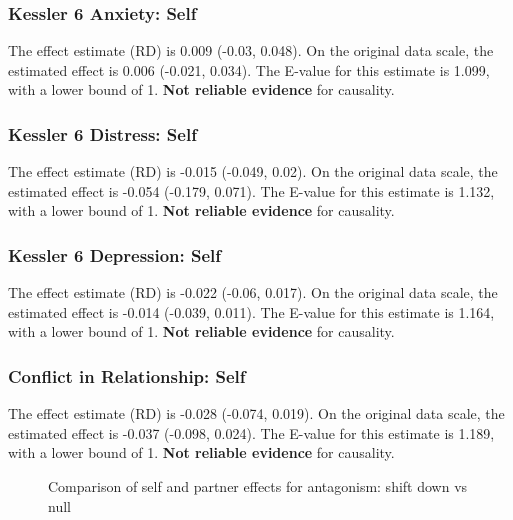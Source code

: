 \documentclass[
  singlecolumn]{article}
\begin{document}
\subsubsection{Kessler 6 Anxiety: Self}\label{kessler-6-anxiety-self-1}

The effect estimate (RD) is 0.009 (-0.03, 0.048). On the original data
scale, the estimated effect is 0.006 (-0.021, 0.034). The E-value for
this estimate is 1.099, with a lower bound of 1. \textbf{Not reliable
evidence} for causality.

\subsubsection{Kessler 6 Distress:
Self}\label{kessler-6-distress-self-1}

The effect estimate (RD) is -0.015 (-0.049, 0.02). On the original data
scale, the estimated effect is -0.054 (-0.179, 0.071). The E-value for
this estimate is 1.132, with a lower bound of 1. \textbf{Not reliable
evidence} for causality.

\subsubsection{Kessler 6 Depression:
Self}\label{kessler-6-depression-self-1}

The effect estimate (RD) is -0.022 (-0.06, 0.017). On the original data
scale, the estimated effect is -0.014 (-0.039, 0.011). The E-value for
this estimate is 1.164, with a lower bound of 1. \textbf{Not reliable
evidence} for causality.

\subsubsection{Conflict in Relationship:
Self}\label{conflict-in-relationship-self-1}

The effect estimate (RD) is -0.028 (-0.074, 0.019). On the original data
scale, the estimated effect is -0.037 (-0.098, 0.024). The E-value for
this estimate is 1.189, with a lower bound of 1. \textbf{Not reliable
evidence} for causality.

\begin{figure}


\caption{\label{fig-results-antagonism-self-partner-down-comparison}Comparison
of self and partner effects for antagonism: shift down vs null}

\end{figure}%
\end{document}
